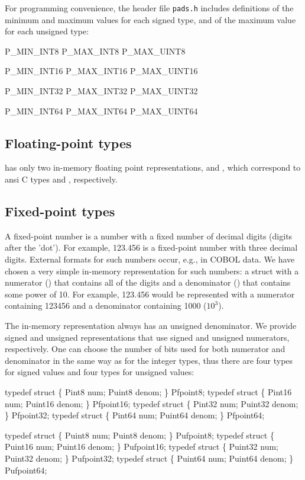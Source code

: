 For programming convenience, the header file {\tt pads.h} includes definitions of the minimum
and maximum values for each signed type, and of the maximum value for each unsigned type:
\begin{tinycode}
P\_MIN\_INT8
P\_MAX\_INT8
P\_MAX\_UINT8

P\_MIN\_INT16
P\_MAX\_INT16
P\_MAX\_UINT16

P\_MIN\_INT32
P\_MAX\_INT32
P\_MAX\_UINT32

P\_MIN\_INT64
P\_MAX\_INT64
P\_MAX\_UINT64
\end{tinycode}

\subsection{Floating-point types}

\PADSL{} has only two in-memory floating point representations,
 and , which correspond to ansi C types 
and , respectively.

\subsection{Fixed-point types}

A fixed-point number is a number with a fixed number of decimal digits
(digits after the 'dot').  For example, 123.456 is a fixed-point
number with three decimal digits.  External formats for such numbers
occur, e.g., in COBOL data.  We have chosen a very simple in-memory
representation for such numbers: a struct with a numerator ()
that contains all of the digits and a denominator () that
contains some power of 10.  For example, 123.456 would be represented
with a numerator containing 123456 and a denominator containing 1000 ($10^3$).

The in-memory representation always has an unsigned denominator. We
provide signed and unsigned representations that use signed and
unsigned numerators, respectively.  One can choose the number of bits
used for both numerator and denominator in the same way as for the
integer types, thus there are four types for signed values
and four types for unsigned values:

\begin{tinycodeaux}{\leftmargin=0in}
typedef struct \{ Pint8   num; Puint8  denom; \} Pfpoint8;
typedef struct \{ Pint16  num; Puint16 denom; \} Pfpoint16;
typedef struct \{ Pint32  num; Puint32 denom; \} Pfpoint32;
typedef struct \{ Pint64  num; Puint64 denom; \} Pfpoint64;

typedef struct \{ Puint8  num; Puint8  denom; \} Pufpoint8;
typedef struct \{ Puint16 num; Puint16 denom; \} Pufpoint16;
typedef struct \{ Puint32 num; Puint32 denom; \} Pufpoint32;
typedef struct \{ Puint64 num; Puint64 denom; \} Pufpoint64;
\end{tinycodeaux}

